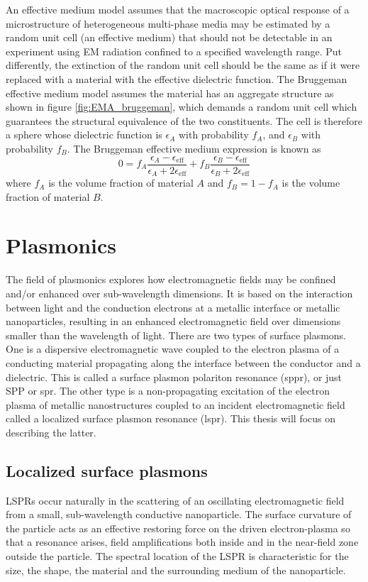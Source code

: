 An effective medium model assumes that the macroscopic optical response of a microstructure of heterogeneous multi-phase media may be estimated by a random unit cell (an effective medium) that should not be detectable in an experiment using EM radiation confined to a specified wavelength range. Put differently, the extinction of the random unit cell should be the same as if it were replaced with a material with the effective dielectric function. The Bruggeman effective medium model assumes the material has an aggregate structure as shown in figure \ref{fig:EMA_bruggeman}, which demands a random unit cell which guarantees the structural equivalence of the two constituents. The cell is therefore a sphere whose dielectric function is $\epsilon_A$ with probability $f_A$, and $\epsilon_B$ with probability $f_B$. The Bruggeman effective medium expression is known as
\begin{equation}
    0 = f_A \frac{\epsilon_A - \epsilon_\text{eff}}{\epsilon_A+2\epsilon_\text{eff}} + f_B \frac{\epsilon_B - \epsilon_\text{eff}}{\epsilon_B+2\epsilon_\text{eff}}
    \label{eq:EMA_Bruggeman}
\end{equation}
where $f_A$ is the volume fraction of material $A$ and $f_B = 1 - f_A$ is the volume fraction of material $B$\cite{hans_arwin}.
\section{Plasmonics}
The field of plasmonics explores how electromagnetic fields may be confined and/or enhanced over sub-wavelength dimensions. It is based on the interaction between light and the conduction electrons at a metallic interface or metallic nanoparticles, resulting in an enhanced electromagnetic field over dimensions smaller than the wavelength of light. There are two types of surface plasmons. One is a dispersive electromagnetic wave coupled to the electron plasma of a conducting material propagating along the interface between the conductor and a dielectric. This is called a surface plasmon polariton resonance (\ac{sppr}), or just SPP or \ac{spr}. The other type is a non-propagating excitation of the electron plasma of metallic nanostructures coupled to an incident electromagnetic field called a localized surface plasmon resonance (\ac{lspr}). This thesis will focus on describing the latter.

\subsection{Localized surface plasmons}
LSPRs occur naturally in the scattering of an oscillating electromagnetic field from a small, sub-wavelength conductive nanoparticle. The surface curvature of the particle acts as an effective restoring force on the driven electron-plasma so that a resonance arises, field amplifications both inside and in the near-field zone outside the particle. The spectral location of the LSPR is characteristic for the size, the shape, the material and the surrounding medium of the nanoparticle.

